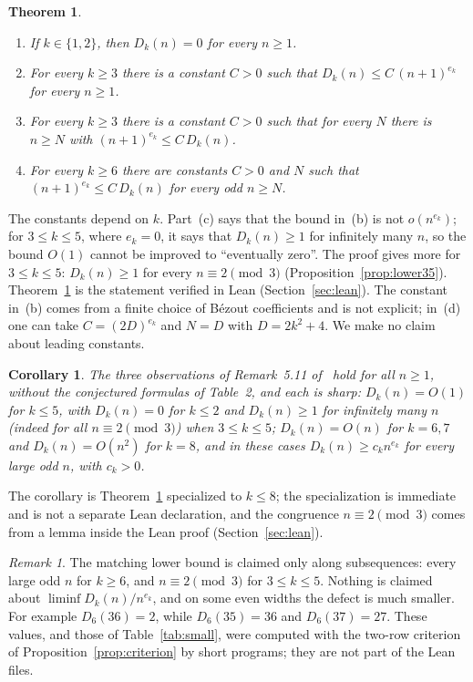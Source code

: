 \documentclass[11pt]{article}
\newtheorem{theorem}{Theorem}
\newtheorem{corollary}{Corollary}
\theoremstyle{definition}
\theoremstyle{remark}
\newtheorem{remark}{Remark}
\begin{document}
\begin{theorem}\label{thm:main}
\begin{enumerate}
\item[(a)] If $k\in\{1,2\}$, then $D_k(n)=0$ for every $n\ge1$.
\item[(b)] For every $k\ge3$ there is a constant $C>0$ such that
$D_k(n)\le C\,(n+1)^{e_k}$ for every $n\ge1$.
\item[(c)] For every $k\ge3$ there is a constant $C>0$ such that for every
$N$ there is $n\ge N$ with $(n+1)^{e_k}\le C\,D_k(n)$.
\item[(d)] For every $k\ge6$ there are constants $C>0$ and $N$ such that
$(n+1)^{e_k}\le C\,D_k(n)$ for every odd $n\ge N$.
\end{enumerate}
\end{theorem}

\noindent The constants depend on $k$. Part~(c) says that the bound in~(b)
is not $o(n^{e_k})$; for $3\le k\le5$, where $e_k=0$, it says that $D_k(n)\ge1$
for infinitely many $n$, so the bound $O(1)$ cannot be improved to ``eventually
zero''. The proof gives more for $3\le k\le5$: $D_k(n)\ge1$ for every
$n\equiv2\pmod3$ (Proposition~\ref{prop:lower35}). Theorem~\ref{thm:main} is
the statement verified in Lean (Section~\ref{sec:lean}). The constant in~(b)
comes from a finite choice of Bézout coefficients and is not explicit; in~(d)
one can take $C=(2D)^{e_k}$ and $N=D$ with $D=2k^2+4$. We make no claim about
leading constants.

\begin{corollary}\label{cor:remark}
The three observations of Remark~5.11 of~\cite{gvz} hold for all $n\ge1$,
without the conjectured formulas of Table~2, and each is sharp:
$D_k(n)=O(1)$ for $k\le5$, with $D_k(n)=0$ for $k\le2$ and $D_k(n)\ge1$ for
infinitely many $n$ (indeed for all $n\equiv2\pmod 3$) when $3\le k\le5$;
$D_k(n)=O(n)$ for $k=6,7$ and $D_k(n)=O(n^2)$ for $k=8$, and in these cases
$D_k(n)\ge c_k n^{e_k}$ for every large odd $n$, with $c_k>0$.
\end{corollary}

\noindent The corollary is Theorem~\ref{thm:main} specialized to $k\le8$; the
specialization is immediate and is not a separate Lean declaration, and the
congruence $n\equiv2\pmod3$ comes from a lemma inside the Lean proof
(Section~\ref{sec:lean}).

\begin{remark}\label{rem:subseq}
The matching lower bound is claimed only along subsequences: every large odd
$n$ for $k\ge6$, and $n\equiv2\pmod 3$ for $3\le k\le5$. Nothing is claimed
about $\liminf D_k(n)/n^{e_k}$, and on some even widths the defect is much
smaller. For example $D_6(36)=2$, while $D_6(35)=36$ and $D_6(37)=27$. These
values, and those of Table~\ref{tab:small}, were computed with the two-row
criterion of Proposition~\ref{prop:criterion} by short programs; they are not
part of the Lean files.
\end{remark}
\end{document}
